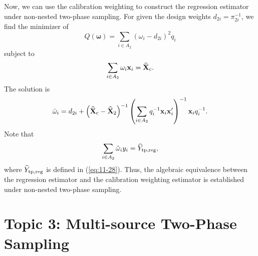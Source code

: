 \documentclass[12pt]{article}
\newcommand{\bx}{\mathbf{x}}
\begin{document}
Now, we can use the calibration weighting to construct the regression estimator under non-nested two-phase sampling. For  given the design weights $d_{2i} = \pi_{2i}^{-1}$, we find the minimizer of 
    $$Q \left( {\bm \omega } \right) = \sum_{i \in A_2} \left(  {\omega_i} - d_{2i}  \right)^2 q_i $$
    subject to 
    $$ \sum_{i \in A_2} {\omega_i} \bx_i = \widehat{\mathbf{X}}_{\rm c} .$$
    The solution is 
    $$ \hat{\omega}_i = d_{2i} + \left( \widehat{\mathbf{X}}_{\rm c} - \widehat{\mathbf{X}}_{\rm 2} \right)^{-1} \left( \sum_{i \in A_2} q_i^{-1} \bx_i \bx_i' \right)^{-1} \bx_i q_i^{-1} . $$
     Note that 
    $$ \sum_{i \in A_2} \hat{\omega}_i y_i = \widehat{Y}_{\rm tp, reg} , $$
    where  $\widehat{Y}_{\rm tp, reg}$ is defined in (\ref{eq:11-28}). 
    Thus, the algebraic equivalence between the  regression estimator and the calibration weighting estimator is established under non-nested two-phase sampling. 



\section*{Topic 3: Multi-source Two-Phase Sampling}




\end{document}
